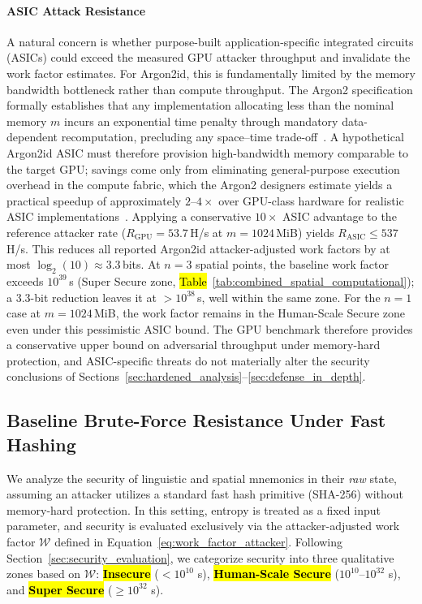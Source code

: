 \documentclass[mathematics,article,accept,pdftex,moreauthors]{Definitions/mdpi}
\begin{document}
\paragraph*{ASIC Attack Resistance}
{A natural concern is whether purpose-built application-specific integrated circuits (ASICs) could exceed the measured GPU attacker throughput and invalidate the work factor estimates. For Argon2id, this is fundamentally limited by the memory bandwidth bottleneck rather than compute throughput. The Argon2 specification formally establishes that any implementation allocating less than the nominal memory $m$ incurs an exponential time penalty through mandatory data-dependent recomputation, precluding any space--time trade-off~\cite{7467361}. A hypothetical Argon2id ASIC must therefore provision high-bandwidth memory comparable to the target GPU; savings come only from eliminating general-purpose execution overhead in the compute fabric, which the Argon2 designers estimate yields a practical speedup of approximately $2$--$4\times$ over GPU-class hardware for realistic ASIC implementations~\cite{7467361,Wetzels2016}. Applying a conservative $10\times$ ASIC advantage to the reference attacker rate ($R_{\text{GPU}} = 53.7$\,H/s at $m=1024$\,MiB) yields $R_{\text{ASIC}} \leq 537$\,H/s. This reduces all reported Argon2id attacker-adjusted work factors by at most $\log_2(10) \approx 3.3$\,bits. At $n=3$ spatial points, the baseline work factor exceeds $10^{39}$\,s (Super Secure zone, \hl{Table}~\ref{tab:combined_spatial_computational}); %
a 3.3-bit reduction leaves it at $>$$10^{38}$\,s, well within the same zone. For the $n=1$ case at $m=1024$\,MiB, the work factor remains in the Human-Scale Secure zone even under this pessimistic ASIC bound. The GPU benchmark therefore provides a conservative upper bound on adversarial throughput under memory-hard protection, and ASIC-specific threats do not materially alter the security conclusions of Sections~\ref{sec:hardened_analysis}--\ref{sec:defense_in_depth}.}

\subsection{Baseline Brute-Force Resistance Under Fast Hashing}
\label{sec:unhardened_analysis}

We analyze the security of linguistic and spatial mnemonics in their \emph{raw} state, assuming an attacker utilizes a standard fast hash primitive (SHA-256) without memory-hard protection. In this setting, entropy is treated as a fixed input parameter, and security is evaluated exclusively via the attacker-adjusted work factor $\mathcal{W}$ defined in Equation~\eqref{eq:work_factor_attacker}. Following Section~\ref{sec:security_evaluation}, we categorize security into three qualitative zones based on $\mathcal{W}$: \textbf{\hl{Insecure} %
} ($<$$10^{10}$ s), \textbf{\hl{Human-Scale Secure}} ($10^{10}$--$10^{32}$ s), and \textbf{\hl{Super Secure}} ($\ge$$10^{32}$ s).
\end{document}
